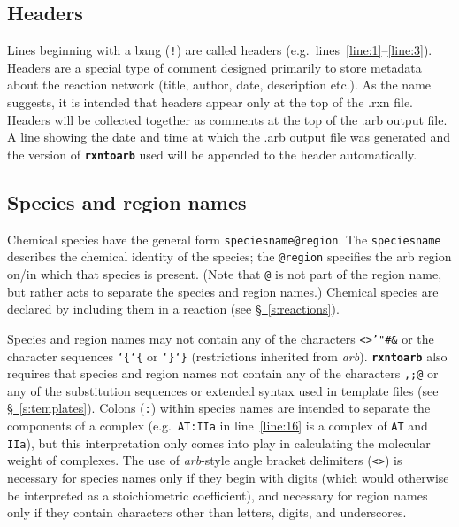 \documentclass[fontsize=12pt,
               captions=abovetable,
               numbers=noenddot,
              ]{scrartcl}
\newcommand{\eg}[1][\ ]{e.g.#1}
\newcommand{\etc}[1][.\ ]{etc#1}
\newcommand{\sect}[1]{\hyperref[s:#1]{\S~\ref{s:#1}}}
\newcommand{\rxntoarb}{\texttt{\textbf{rxntoarb}}}
\newcommand{\syntax}[2]{\textcolor{#1}{\texttt{#2}}}
\newcommand{\lnum}[1]{line~\ref{line:#1}}
\newcommand{\lnums}[2]{lines~\ref{line:#1}--\ref{line:#2}}
\begin{document}
\subsection{Headers}

Lines beginning with a bang (\syntax{subs}{!}) are called headers (\eg \lnums{1}{3}). Headers are a special type of comment designed primarily to store metadata about the reaction network (title, author, date, description \etc[.]). As the name suggests, it is intended that headers appear only at the top of the .rxn file. Headers will be collected together as comments at the top of the .arb output file. A line showing the date and time at which the .arb output file was generated and the version of \rxntoarb{} used will be appended to the header automatically.

\subsection{Species and region names \label{s:names}}

Chemical species have the general form \texttt{speciesname}\syntax{special}{@region}. The \texttt{speciesname} describes the chemical identity of the species; the \syntax{special}{@region} specifies the arb region on\slash{}in which that species is present. (Note that \syntax{special}{@} is not part of the region name, but rather acts to separate the species and region names.) Chemical species are declared by including them in a reaction (see \sect{reactions}).

Species and region names may not contain any of the characters \texttt{<>'"\#\&} or the character sequences \texttt{\char`\{\char`\{} or \texttt{\char`\}\char`\}} (restrictions inherited from \emph{arb}). \rxntoarb{} also requires that species and region names not contain any of the characters \texttt{,}\syntax{statement}{;}\syntax{special}{@} or any of the substitution sequences or extended syntax used in template files (see \sect{templates}). Colons (\texttt{:}) within species names are intended to separate the components of a complex (\eg \texttt{AT:IIa} in \lnum{16} is a complex of \texttt{AT} and \texttt{IIa}), but this interpretation only comes into play in calculating the molecular weight of complexes. The use of \emph{arb}-style angle bracket delimiters (\texttt{<>}) is necessary for species names only if they begin with digits (which would otherwise be interpreted as a stoichiometric coefficient), and necessary for region names only if they contain characters other than letters, digits, and underscores.
\end{document}
